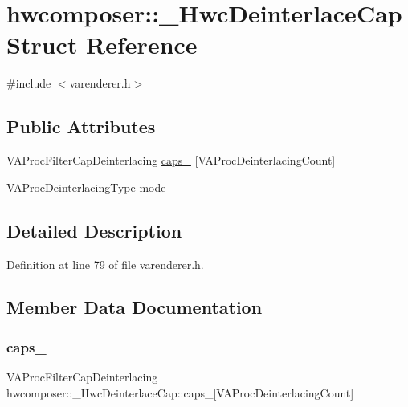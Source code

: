 \hypertarget{structhwcomposer_1_1__HwcDeinterlaceCap}{}\section{hwcomposer\+:\+:\+\_\+\+Hwc\+Deinterlace\+Cap Struct Reference}
\label{structhwcomposer_1_1__HwcDeinterlaceCap}


{\ttfamily \#include $<$varenderer.\+h$>$}

\subsection*{Public Attributes}
\begin{DoxyCompactItemize}
\item 
V\+A\+Proc\+Filter\+Cap\+Deinterlacing \mbox{\hyperlink{structhwcomposer_1_1__HwcDeinterlaceCap_ad5822e137156ac4bd12edd5a7da72e8f}{caps\+\_\+}} \mbox{[}V\+A\+Proc\+Deinterlacing\+Count\mbox{]}
\item 
V\+A\+Proc\+Deinterlacing\+Type \mbox{\hyperlink{structhwcomposer_1_1__HwcDeinterlaceCap_a188e0d349ff3c40e27be247592dfbcbc}{mode\+\_\+}}
\end{DoxyCompactItemize}


\subsection{Detailed Description}


Definition at line 79 of file varenderer.\+h.



\subsection{Member Data Documentation}
\mbox{\label{structhwcomposer_1_1__HwcDeinterlaceCap_ad5822e137156ac4bd12edd5a7da72e8f}} 
\subsubsection{\texorpdfstring{caps\+\_\+}{caps\_}}
{\footnotesize\ttfamily V\+A\+Proc\+Filter\+Cap\+Deinterlacing hwcomposer\+::\+\_\+\+Hwc\+Deinterlace\+Cap\+::caps\+\_\+\mbox{[}V\+A\+Proc\+Deinterlacing\+Count\mbox{]}}



